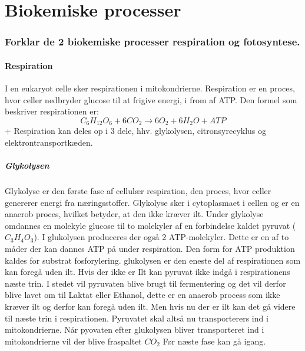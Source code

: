 \newpage
\part{Biokemiske processer}
    \section{Forklar de 2 biokemiske processer respiration og fotosyntese.}
        \subsection{Respiration}\label{sec:respiration}
            I en eukaryot celle sker respirationen i mitokondrierne. Respiration er en proces, hvor celler nedbryder glucose til at frigive energi, i from af ATP.
            Den formel som beskriver respirationen er: \begin{equation}C_6H_{12}O_6 + 6CO_2 \rightarrow 6O_2 + 6H_2O + ATP \end{equation}+
            Respiration kan deles op i 3 dele, hhv. glykolysen, citronsyrecyklus og elektrontransportkæden.

            \subsubsection{Glykolysen}
                Glykolyse er den første fase af cellulær respiration, den proces, hvor celler genererer energi fra næringsstoffer. Glykolyse sker i cytoplasmaet i cellen og er en anaerob proces, hvilket betyder, at den ikke kræver ilt. Under glykolyse omdannes en molekyle glucose til to molekyler af en forbindelse kaldet pyruvat (\begin{math}C_3H_4O_3\end{math}). I glukolysen produceres der også 2 ATP-molekyler. Dette er en af to måder der kan dannes ATP på under respiration. Den form for ATP produktion kaldes for substrat fosforylering. glukolysen er den eneste del af respirationen som kan foregå uden ilt. Hvis der ikke er Ilt kan pyruvat ikke indgå  i respirationens næste trin. I stedet vil pyruvaten blive brugt til fermentering og det vil derfor blive lavet om til Laktat eller Ethanol, dette er en anaerob process som ikke kræver ilt og derfor kan foregå uden ilt. Men hvis nu der er ilt kan det gå videre til næste trin i respirationen. Pyruvatet skal altså nu transporterers ind i mitokondrierne. Når pyovaten efter glukolysen bliver transporteret ind i mitokondrierne vil der blive fraspaltet \begin{math}
                CO_2\end{math} Før næste fase kan gå igang. 

